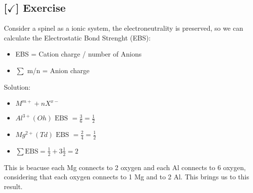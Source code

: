 \subsection{[$\checkmark$] Exercise}

Consider a spinel as a ionic system, the electroneutrality is preserved, so we can calculate the Electrostatic Bond Strenght (EBS):

\begin{itemize}
    \item EBS = Cation charge / number of Anions
    \item $\sum$ m/n = Anion charge
\end{itemize}

Solution:

\begin{itemize}
    \item $M^{m+} + n X^{x-}$
    \item $Al^{3+} (Oh) \text{ EBS } = \frac{3}{6} = \frac{1}{2}$
    \item $Mg^{2+} (Td) \text{ EBS } = \frac{2}{4} = \frac{1}{2}$
    \item $\sum{\text{EBS}} = \frac{1}{2} + 3\frac{1}{2} = 2$
\end{itemize}

This is beacuse each Mg connects to 2 oxygen and each Al connects to 6 oxygen, considering that each oxygen connects to 1 Mg and to 2 Al. This brings us to this result.